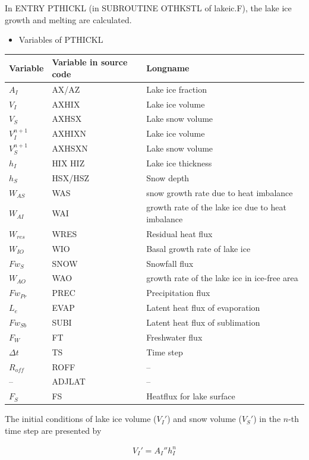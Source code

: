 In ENTRY PTHICKL (in SUBROUTINE OTHKSTL of lakeic.F), the lake ice growth and melting are calculated.

\begin{itemize}
\tightlist
\item
  Variables of PTHICKL
\end{itemize}

\begin{longtable}[]{@{}lll@{}}
\toprule
Variable & Variable in source code & Longname \\
\midrule
\endhead
\(A_I\) & AX/AZ & Lake ice fraction \\
\(V_I\) & AXHIX & Lake ice volume \\
\(V_S\) & AXHSX & Lake snow volume \\
\(V_I^{n+1}\) & AXHIXN & Lake ice volume \\
\(V_S^{n+1}\) & AXHSXN & Lake snow volume \\
\(h_I\) & HIX HIZ & Lake ice thickness \\
\(h_S\) & HSX/HSZ & Snow depth \\
\(W_{AS}\) & WAS & snow growth rate due to heat imbalance \\
\(W_{AI}\) & WAI & growth rate of the lake ice due to heat imbalance \\
\(W_{res}\) & WRES & Residual heat flux \\
\(W_{IO}\) & WIO & Basal growth rate of lake ice \\
\(Fw_S\) & SNOW & Snowfall flux \\
\(W_{AO}\) & WAO & growth rate of the lake ice in ice-free area \\
\(Fw_{Pr}\) & PREC & Precipitation flux \\
\(L_e\) & EVAP & Latent heat flux of evaporation \\
\(Fw_{Sb}\) & SUBI & Latent heat flux of sublimation \\
\(F_W\) & FT & Freshwater flux \\
\(\Delta t\) & TS & Time step \\
\(R_{off}\) & ROFF & -- \\
-- & ADJLAT & -- \\
\(F_S\) & FS & Heatflux for lake surface \\
\bottomrule
\end{longtable}

The initial conditions of lake ice volume (\(V_I'\)) and snow volume (\(V_S'\)) in the \(n\)-th time step are presented by

\begin{eqnarray}
    V_I' = A_I'' h_I^n
\end{eqnarray}

